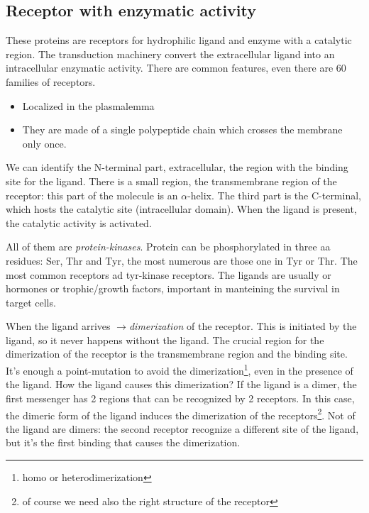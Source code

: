 \documentclass[a4paper, 12pt]{book}
\newcommand{\lfreccia}{\ensuremath{\longrightarrow}}
\begin{document}
\subsection{Receptor with enzymatic activity}
These proteins are receptors for hydrophilic ligand and enzyme with a catalytic region. The transduction machinery convert the extracellular ligand into an intracellular enzymatic activity. There are common features, even there are 60 families of receptors.
\begin{itemize}
\item{Localized in the plasmalemma}
\item{They are made of a single polypeptide chain which crosses the membrane only once.}
\end{itemize}
 We can identify the N-terminal part, extracellular, the region with the binding site for the ligand.  There is a small region, the transmembrane region of the receptor: this part of the molecule is an $\alpha$-helix. The third part is the C-terminal, which hosts the catalytic site (intracellular domain). When the ligand is present, the catalytic activity is activated.
 
 All of them are \emph{protein-kinases}. Protein can be phosphorylated in three aa residues: Ser, Thr and Tyr, the most numerous are those one in Tyr or Thr. The most common receptors ad tyr-kinase receptors. The ligands are usually or hormones or trophic/growth factors, important in manteining the survival in target cells.

When the ligand arrives \lfreccia \emph{dimerization} of the receptor. This is initiated by the ligand, so it never happens without the ligand. The crucial region for the dimerization of the receptor is the transmembrane region and the binding site. It's enough a point-mutation to avoid the dimerization\footnote{homo or heterodimerization}, even in the presence of the ligand. How the ligand causes this dimerization? If the ligand is a dimer, the first messenger has 2 regions that can be recognized by 2 receptors. In this case, the dimeric form of the ligand induces the dimerization of the receptors\footnote{of course we need also the right structure of the receptor}.
Not of the ligand are dimers: the second receptor recognize a different site of the ligand, but it's the first binding that causes the dimerization.
\end{document}
